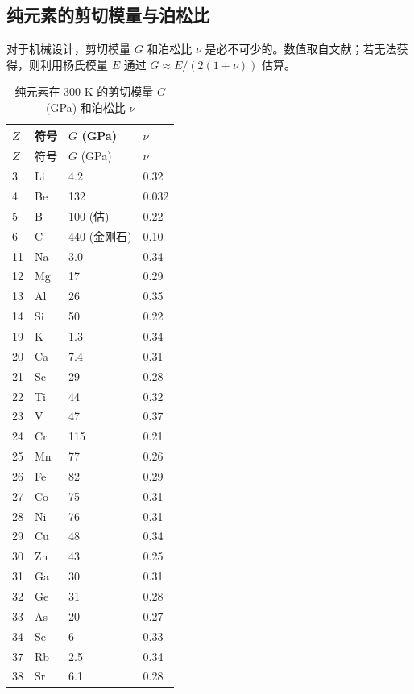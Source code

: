 \documentclass[12pt,a4paper]{article}
\begin{document}
	\subsection{纯元素的剪切模量与泊松比}
	\label{subsec:elastic-constants}
	
	对于机械设计，剪切模量 \(G\) 和泊松比 \(\nu\) 是必不可少的。数值取自文献；若无法获得，则利用杨氏模量 \(E\) 通过 \(G \approx E/(2(1+\nu))\) 估算。
	
	\begin{longtable}{p{0.6cm}p{1.2cm}p{1.5cm}p{1.5cm}}
		\caption{纯元素在 300 K 的剪切模量 \(G\) (GPa) 和泊松比 \(\nu\)} \label{tab:elastic-constants-all} \\
		\toprule
		\(Z\) & 符号 & \(G\) (GPa) & \(\nu\) \\
		\midrule
		\endfirsthead
		\toprule
		\(Z\) & 符号 & \(G\) (GPa) & \(\nu\) \\
		\midrule
		\endhead
		3  & Li & 4.2 & 0.32 \\
		4  & Be & 132 & 0.032 \\
		5  & B  & 100 (估) & 0.22 \\
		6  & C  & 440 (金刚石) & 0.10 \\
		11 & Na & 3.0 & 0.34 \\
		12 & Mg & 17 & 0.29 \\
		13 & Al & 26 & 0.35 \\
		14 & Si & 50 & 0.22 \\
		19 & K  & 1.3 & 0.34 \\
		20 & Ca & 7.4 & 0.31 \\
		21 & Sc & 29 & 0.28 \\
		22 & Ti & 44 & 0.32 \\
		23 & V  & 47 & 0.37 \\
		24 & Cr & 115 & 0.21 \\
		25 & Mn & 77 & 0.26 \\
		26 & Fe & 82 & 0.29 \\
		27 & Co & 75 & 0.31 \\
		28 & Ni & 76 & 0.31 \\
		29 & Cu & 48 & 0.34 \\
		30 & Zn & 43 & 0.25 \\
		31 & Ga & 30 & 0.31 \\
		32 & Ge & 31 & 0.28 \\
		33 & As & 20 & 0.27 \\
		34 & Se & 6 & 0.33 \\
		37 & Rb & 2.5 & 0.34 \\
		38 & Sr & 6.1 & 0.28 \\

\end{longtable}
\end{document}
